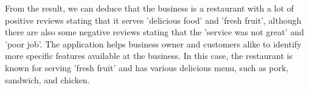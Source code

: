 From the result, we can deduce that the business is a restaurant with a lot of positive reviews stating that it serves 'delicious food' and 'fresh fruit', although there are also some negative reviews stating that the 'service was not great' and 'poor job'. The application helps business owner and customers alike to identify more specific features available at the business. In this case, the restaurant is known for serving 'fresh fruit' and has various delicious menu, such as pork, sandwich, and chicken.